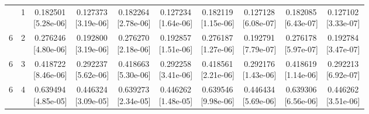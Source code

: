 \documentclass[12pt,letterpaper]{article}
\theoremstyle{plain}
\theoremstyle{definition}
\begin{document}
\begin{table}[p]
\begin{adjustbox}{max width=\linewidth}
\begin{tabular}{@{}rr*{8}{c}@{}}
\addlinespace[2pt]
6 & 1 & \shortstack{0.182501\\[-1pt]{\scriptsize[5.28e-06]}} & \shortstack{0.127373\\[-1pt]{\scriptsize[3.19e-06]}} & \shortstack{0.182264\\[-1pt]{\scriptsize[2.78e-06]}} & \shortstack{0.127234\\[-1pt]{\scriptsize[1.64e-06]}} & \shortstack{0.182119\\[-1pt]{\scriptsize[1.15e-06]}} & \shortstack{0.127128\\[-1pt]{\scriptsize[6.08e-07]}} & \shortstack{0.182085\\[-1pt]{\scriptsize[6.43e-07]}} & \shortstack{0.127102\\[-1pt]{\scriptsize[3.33e-07]}}\\
6 & 2 & \shortstack{0.276246\\[-1pt]{\scriptsize[4.80e-06]}} & \shortstack{0.192800\\[-1pt]{\scriptsize[3.19e-06]}} & \shortstack{0.276270\\[-1pt]{\scriptsize[2.18e-06]}} & \shortstack{0.192857\\[-1pt]{\scriptsize[1.51e-06]}} & \shortstack{0.276187\\[-1pt]{\scriptsize[1.27e-06]}} & \shortstack{0.192791\\[-1pt]{\scriptsize[7.79e-07]}} & \shortstack{0.276178\\[-1pt]{\scriptsize[5.97e-07]}} & \shortstack{0.192784\\[-1pt]{\scriptsize[3.47e-07]}}\\
6 & 3 & \shortstack{0.418722\\[-1pt]{\scriptsize[8.46e-06]}} & \shortstack{0.292237\\[-1pt]{\scriptsize[5.62e-06]}} & \shortstack{0.418663\\[-1pt]{\scriptsize[5.30e-06]}} & \shortstack{0.292258\\[-1pt]{\scriptsize[3.41e-06]}} & \shortstack{0.418561\\[-1pt]{\scriptsize[2.21e-06]}} & \shortstack{0.292176\\[-1pt]{\scriptsize[1.43e-06]}} & \shortstack{0.418619\\[-1pt]{\scriptsize[1.14e-06]}} & \shortstack{0.292213\\[-1pt]{\scriptsize[6.92e-07]}}\\
6 & 4 & \shortstack{0.639494\\[-1pt]{\scriptsize[4.85e-05]}} & \shortstack{0.446324\\[-1pt]{\scriptsize[3.09e-05]}} & \shortstack{0.639273\\[-1pt]{\scriptsize[2.34e-05]}} & \shortstack{0.446262\\[-1pt]{\scriptsize[1.48e-05]}} & \shortstack{0.639546\\[-1pt]{\scriptsize[9.98e-06]}} & \shortstack{0.446434\\[-1pt]{\scriptsize[5.69e-06]}} & \shortstack{0.639306\\[-1pt]{\scriptsize[6.56e-06]}} & \shortstack{0.446262\\[-1pt]{\scriptsize[3.51e-06]}}\\

\end{tabular}
\end{adjustbox}
\end{table}
\end{document}
